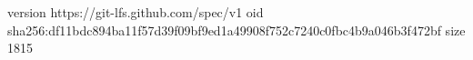 version https://git-lfs.github.com/spec/v1
oid sha256:df11bdc894ba11f57d39f09bf9ed1a49908f752c7240c0fbc4b9a046b3f472bf
size 1815
